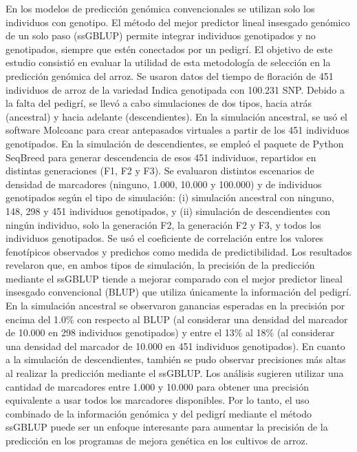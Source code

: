 \documentclass[11pt,spanish,a4paper,oneside,]{book} %
\begin{document}
\noindent 
En los modelos de predicción genómica convencionales se utilizan solo los individuos con genotipo. El método del mejor predictor lineal insesgado genómico de un solo paso (ssGBLUP) permite integrar individuos genotipados y no genotipados, siempre que estén conectados por un pedigrí. El objetivo de este estudio consistió en evaluar la utilidad de esta metodología de selección en la predicción genómica del arroz. Se usaron datos del tiempo de floración de 451 individuos de arroz de la variedad Indica genotipada con 100.231 SNP. Debido a la falta del pedigrí, se llevó a cabo simulaciones de dos tipos, hacia atrás (ancestral) y hacia adelante (descendientes). En la simulación ancestral, se usó el software Molcoanc para crear antepasados virtuales a partir de los 451 individuos genotipados. En la simulación de descendientes, se empleó el paquete de Python SeqBreed para generar descendencia de esos 451 individuos, repartidos en distintas generaciones (F1, F2 y F3). Se evaluaron distintos escenarios de densidad de marcadores (ninguno, 1.000, 10.000 y 100.000) y de individuos genotipados según el tipo de simulación: (i) simulación ancestral con ninguno, 148, 298 y 451 individuos genotipados, y (ii) simulación de descendientes con ningún individuo, solo la generación F2, la generación F2 y F3, y todos los individuos genotipados. Se usó el coeficiente de correlación entre los valores fenotípicos observados y predichos como medida de predictibilidad. Los resultados revelaron que, en ambos tipos de simulación, la precisión de la predicción mediante el ssGBLUP tiende a mejorar comparado con el mejor predictor lineal insesgado convencional (BLUP) que utiliza únicamente la información del pedigrí. En la simulación ancestral se observaron ganancias esperadas en la precisión por encima del 1.0\% con respecto al BLUP (al considerar una densidad del marcador de 10.000 en 298 individuos genotipados) y entre el 13\% al 18\% (al considerar una densidad del marcador de 10.000 en 451 individuos genotipados). En cuanto a la simulación de descendientes, también se pudo observar precisiones más altas al realizar la predicción mediante el ssGBLUP. Los análisis sugieren utilizar una cantidad de marcadores entre 1.000 y 10.000 para obtener una precisión equivalente a usar todos los marcadores disponibles. Por lo tanto, el uso combinado de la información genómica y del pedigrí mediante el método ssGBLUP puede ser un enfoque interesante para aumentar la precisión de la predicción en los programas de mejora genética en los cultivos de arroz.
\end{document}
